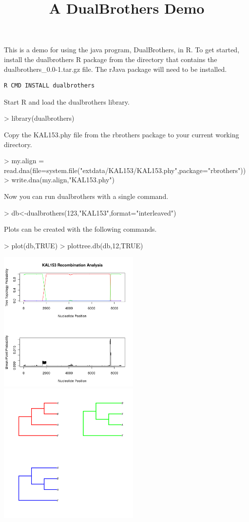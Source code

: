 \documentclass{article}
\begin{document}
\title{A DualBrothers Demo}
\maketitle

This is a demo for using the java program, DualBrothers, in R.  To
get started, install the dualbrothers R package from the directory that contains the dualbrothers\_0.0-1.tar.gz file. The rJava package will need to be installed.
\begin{verbatim}
R CMD INSTALL dualbrothers
\end{verbatim}

Start R and load the dualbrothers library.

\begin{Schunk}
\begin{Sinput}
> library(dualbrothers)
\end{Sinput}
\end{Schunk}

Copy the KAL153.phy file from the rbrothers package to your current working directory.
\begin{Schunk}
\begin{Sinput}
> my.align = read.dna(file=system.file("extdata/KAL153/KAL153.phy",package="rbrothers"))
> write.dna(my.align,"KAL153.phy")
\end{Sinput}
\end{Schunk}

Now you can run dualbrothers with a single command.
\begin{Schunk}
\begin{Sinput}
> db<-dualbrothers(123,"KAL153",format="interleaved")
\end{Sinput}
\end{Schunk}

Plots can be created with the following commands.
\begin{Schunk}
\begin{Sinput}
> plot(db,TRUE)
> plottree.db(db,12,TRUE)
\end{Sinput}
\end{Schunk}

\includegraphics[width=70mm]{KAL153p1.png}
\includegraphics[width=70mm]{KAL153p2.png}
\end{document}
